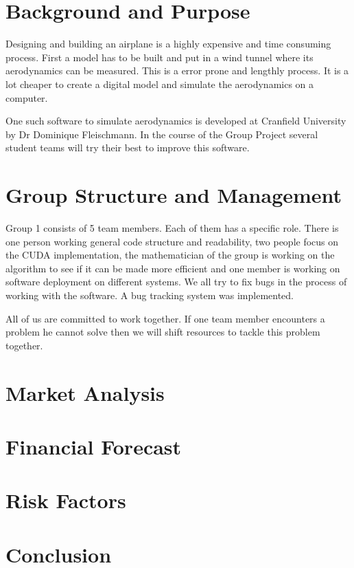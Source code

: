 \documentclass[11pt]{article}
\begin{document}
\section{Background and Purpose}
Designing and building an airplane is a highly expensive and time consuming process. First a model has to be built and put in a wind tunnel where its aerodynamics can be measured. This is a error prone and lengthly process. It is a lot cheaper to create a digital model and simulate the aerodynamics on a computer.

One such software to simulate aerodynamics is developed at Cranfield University by Dr Dominique Fleischmann. In the course of the Group Project several student teams will try their best to improve this software.




\section{Group Structure and Management}

Group 1 consists of 5 team members. Each of them has a specific role. There is one person working general code structure and readability, two people focus on the CUDA implementation, the mathematician of the group is working on the algorithm to see if it can be made more efficient and one member is working on software deployment on different systems. We all try to fix bugs in the process of working with the software. A bug tracking system was implemented.

All of us are committed to work together. If one team member encounters a problem he cannot solve then we will shift resources to tackle this problem together. 



\section{Market Analysis}




\section{Financial Forecast}



\section{Risk Factors}




\section{Conclusion}
\end{document}
